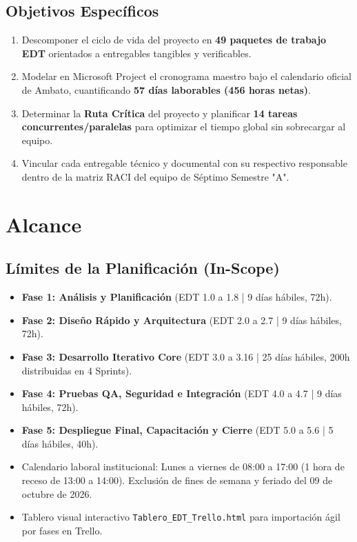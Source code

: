 \documentclass[12pt,a4paper]{article}
\begin{document}
\subsection{Objetivos Específicos}
\begin{enumerate}[leftmargin=1.5em, itemsep=2pt, topsep=2pt]
    \item Descomponer el ciclo de vida del proyecto en \textbf{49 paquetes de trabajo EDT} orientados a entregables tangibles y verificables.
    \item Modelar en Microsoft Project el cronograma maestro bajo el calendario oficial de Ambato, cuantificando \textbf{57 días laborables (456 horas netas)}.
    \item Determinar la \textbf{Ruta Crítica} del proyecto y planificar \textbf{14 tareas concurrentes/paralelas} para optimizar el tiempo global sin sobrecargar al equipo.
    \item Vincular cada entregable técnico y documental con su respectivo responsable dentro de la matriz RACI del equipo de Séptimo Semestre "A".
\end{enumerate}

\section{Alcance}

\subsection{Límites de la Planificación (In-Scope)}
\begin{itemize}[leftmargin=1.5em, itemsep=1.5pt, topsep=1.5pt]
    \item \textbf{Fase 1: Análisis y Planificación} (EDT 1.0 a 1.8 | 9 días hábiles, 72h).
    \item \textbf{Fase 2: Diseño Rápido y Arquitectura} (EDT 2.0 a 2.7 | 9 días hábiles, 72h).
    \item \textbf{Fase 3: Desarrollo Iterativo Core} (EDT 3.0 a 3.16 | 25 días hábiles, 200h distribuidas en 4 Sprints).
    \item \textbf{Fase 4: Pruebas QA, Seguridad e Integración} (EDT 4.0 a 4.7 | 9 días hábiles, 72h).
    \item \textbf{Fase 5: Despliegue Final, Capacitación y Cierre} (EDT 5.0 a 5.6 | 5 días hábiles, 40h).
    \item Calendario laboral institucional: Lunes a viernes de 08:00 a 17:00 (1 hora de receso de 13:00 a 14:00). Exclusión de fines de semana y feriado del 09 de octubre de 2026.
    \item Tablero visual interactivo \texttt{Tablero\_EDT\_Trello.html} para importación ágil por fases en Trello.
\end{itemize}
\end{document}
